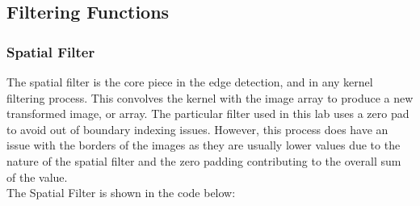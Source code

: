 \documentclass{article}
\begin{document}
	\subsection{Filtering Functions}
	
	\subsubsection{Spatial Filter}
	
	The spatial filter is the core piece in the edge detection, and in any kernel filtering process. This convolves the kernel with the image array to produce a new transformed image, or array. The particular filter used in this lab uses a zero pad to avoid out of boundary indexing issues. However, this process does have an issue with the borders of the images as they are usually lower values due to the nature of the spatial filter and the zero padding contributing to the overall sum of the value.\\
	
	The Spatial Filter is shown in the code below:\\
	
\end{document}
